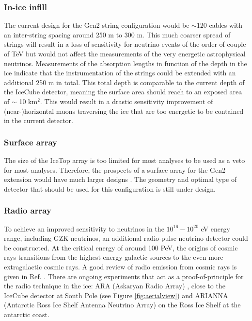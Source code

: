 \subsubsection{In-ice infill}
The current design for the Gen2 string configuration would be $\sim$120 cables with an inter-string spacing around 250 m to 300 m. This much coarser spread of strings will result in a loss of sensitivity for neutrino events of the order of couple of TeV but would not affect the measurements of the very energetic astrophysical neutrinos. Measurements of the absorption lengths in function of the depth in the ice indicate that the instrumentation of the strings could be extended with an additional 250 m in total. This total depth is comparable to the current depth of the IceCube detector, meaning the surface area should reach to an exposed area of $\sim$ 10 km$^2$. This would result in a drastic sensitivity improvement of (near-)horizontal muons traversing the ice that are too energetic to be contained in the current detector.
\subsubsection{Surface array}
The size of the IceTop array is too limited for most analyses to be used as a veto for most analyses. Therefore, the prospects of a surface array for the Gen2 extension would have much larger designs \cite{Euler:2015oen}. The geometry and optimal type of detector that should be used for this configuration is still under design.
\subsubsection{Radio array}
\label{subsub:radio}
To achieve an improved sensitivity to neutrinos in the $10^{16} - 10^{20}$ eV energy range, including GZK neutrinos, an additional radio-pulse neutrino detector could be constructed. At the critical energy of around 100 PeV, the origins of cosmic rays transitions from the highest-energy galactic sources to the even more extragalactic cosmic rays. A good review of radio emission from cosmic rays is given in Ref. \cite{Schroder:2016hrv}. There are ongoing experiments that act as a proof-of-principle for the radio technique in the ice: ARA (Askaryan Radio Array) \cite{Allison:2015eky}, close to the IceCube detector at South Pole (see Figure \ref{fig:aerialview}) and ARIANNA (Antarctic Ross Ice Shelf Antenna Neutrino Array) \cite{Glaser:2018ifj} on the Ross Ice Shelf at the antarctic coast.



